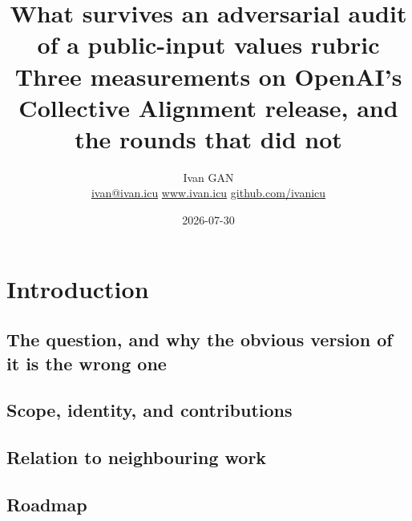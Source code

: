 

\title{\sffamily\bfseries What survives an adversarial audit of a public-input values rubric\\[0.35em]
  {\large\mdseries Three measurements on OpenAI's Collective Alignment release, and the rounds that did not}}
\author{\sffamily Ivan GAN\\[3pt]
\small\mdseries
\href{mailto:ivan@ivan.icu}{ivan@ivan.icu}
\quad
\href{https://www.ivan.icu}{www.ivan.icu}
\quad
\href{https://github.com/ivanicu}{github.com/ivanicu}}
\date{2026-07-30}


\maketitle

\begin{abstract}
\end{abstract}

\section{Introduction}
\subsection{The question, and why the obvious version of it is the wrong one}
\subsection{Scope, identity, and contributions}
\subsection{Relation to neighbouring work}
\subsection{Roadmap}

